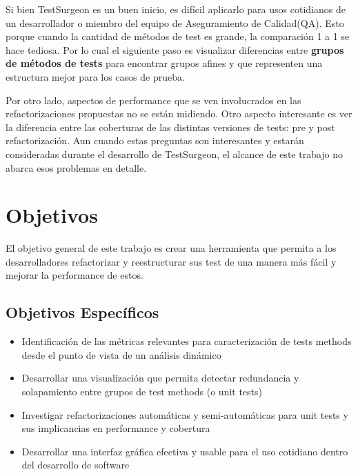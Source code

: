 \documentclass[12pt,spanish,letterpaper]{article}
\begin{document}
\par Si bien TestSurgeon es un buen inicio, es difícil aplicarlo para usos cotidianos de un desarrollador o miembro del equipo de Aseguramiento de Calidad(QA). Esto porque cuando la cantidad de métodos de test es grande, la comparación 1 a 1 se hace tediosa. Por lo cual el siguiente paso es visualizar diferencias entre \textbf{grupos de métodos de tests} para encontrar grupos afines y que representen una estructura mejor para los casos de prueba.

\par Por otro lado, aspectos de performance que se ven involucrados en las refactorizaciones propuestas no se están midiendo. Otro aspecto interesante es ver la diferencia entre las coberturas de las distintas versiones de tests: pre y post refactorización. Aun cuando estas preguntas son interesantes y estarán consideradas durante el desarrollo de TestSurgeon, el alcance de este trabajo no abarca esos problemas en detalle.	




\section{Objetivos}
\par El objetivo general de este trabajo es crear una herramienta que permita a los desarrolladores refactorizar y reestructurar sus test de una manera más fácil y mejorar la performance de estos.

\subsection*{Objetivos Específicos}
\begin{itemize}
\item Identificación de las métricas relevantes para caracterización de tests methods desde el punto de vista de un análisis dinámico
\item Desarrollar una visualización que permita detectar redundancia y solapamiento entre grupos de test methods (o unit tests)
\item Investigar refactorizaciones automáticas y semi-automáticas para unit tests y sus implicancias en performance y cobertura
\item Desarrollar una interfaz gráfica efectiva y usable para el uso cotidiano dentro del desarrollo de software
\end{itemize}
\end{document}

